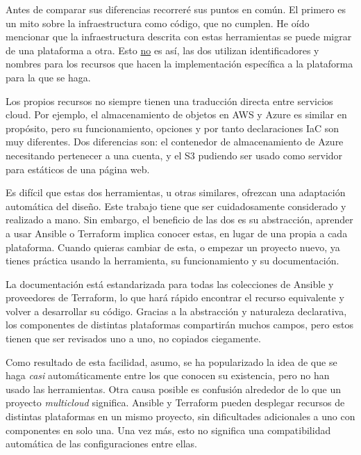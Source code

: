 \documentclass[11pt]{article}
\begin{document}
\begin{flushleft}
Antes de comparar sus diferencias recorreré sus puntos en común. El primero es un mito sobre la infraestructura como código, que no cumplen. He oído mencionar que la infraestructura descrita con estas herramientas se puede migrar de una plataforma a otra. Esto \underline{no} es así, las dos utilizan identificadores y nombres para los recursos que hacen la implementación específica a la plataforma para la que se haga. 
\linebreak

Los propios recursos no siempre tienen una traducción directa entre servicios cloud. Por ejemplo, el almacenamiento de objetos en AWS y Azure es similar en propósito, pero su funcionamiento, opciones y por tanto declaraciones IaC son muy diferentes. Dos diferencias son: el contenedor de almacenamiento de Azure necesitando pertenecer a una cuenta, y el S3 pudiendo ser usado como servidor para estáticos de una página web. 
\linebreak

Es difícil que estas dos herramientas, u otras similares, ofrezcan una adaptación automática del diseño. Este trabajo tiene que ser cuidadosamente considerado y realizado a mano. Sin embargo, el beneficio de las dos es su abstracción, aprender a usar Ansible o Terraform implica conocer estas, en lugar de una propia a cada plataforma. Cuando quieras cambiar de esta, o empezar un proyecto nuevo, ya tienes práctica usando la herramienta, su funcionamiento y su documentación.
\linebreak

La documentación está estandarizada para todas las colecciones de Ansible y proveedores de Terraform, lo que hará rápido encontrar el recurso equivalente y volver a desarrollar su código. Gracias a la abstracción y naturaleza declarativa, los componentes de distintas plataformas compartirán muchos campos, pero estos tienen que ser revisados uno a uno, no copiados ciegamente.
\linebreak

Como resultado de esta facilidad, asumo, se ha popularizado la idea de que se haga \textit{casi} automáticamente entre los que conocen su existencia, pero no han usado las herramientas. Otra causa posible es confusión alrededor de lo que un proyecto \textit{multicloud} significa. Ansible y Terraform pueden desplegar recursos de distintas plataformas en un mismo proyecto, sin dificultades adicionales a uno con componentes en solo una. Una vez más, esto no significa una compatibilidad automática de las configuraciones entre ellas.




\end{flushleft}
\end{document}
